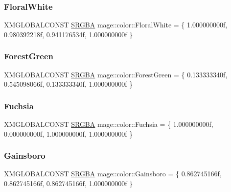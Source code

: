 \hypertarget{namespacemage_1_1color_ac2c360600f107bfa162703196ccf66ac}{}\label{namespacemage_1_1color_ac2c360600f107bfa162703196ccf66ac} 
\subsubsection{\texorpdfstring{Floral\+White}{FloralWhite}}
{\footnotesize\ttfamily X\+M\+G\+L\+O\+B\+A\+L\+C\+O\+N\+ST \hyperlink{structmage_1_1_s_r_g_b_a}{S\+R\+G\+BA} mage\+::color\+::\+Floral\+White = \{ 1.\+000000000f, 0.\+980392218f, 0.\+941176534f, 1.\+000000000f \}}

\hypertarget{namespacemage_1_1color_abb3995cf95a62e2f3407b9193d16fd8e}{}\label{namespacemage_1_1color_abb3995cf95a62e2f3407b9193d16fd8e} 
\subsubsection{\texorpdfstring{Forest\+Green}{ForestGreen}}
{\footnotesize\ttfamily X\+M\+G\+L\+O\+B\+A\+L\+C\+O\+N\+ST \hyperlink{structmage_1_1_s_r_g_b_a}{S\+R\+G\+BA} mage\+::color\+::\+Forest\+Green = \{ 0.\+133333340f, 0.\+545098066f, 0.\+133333340f, 1.\+000000000f \}}

\hypertarget{namespacemage_1_1color_a5da168035660622308cc0dedb7a2c898}{}\label{namespacemage_1_1color_a5da168035660622308cc0dedb7a2c898} 
\subsubsection{\texorpdfstring{Fuchsia}{Fuchsia}}
{\footnotesize\ttfamily X\+M\+G\+L\+O\+B\+A\+L\+C\+O\+N\+ST \hyperlink{structmage_1_1_s_r_g_b_a}{S\+R\+G\+BA} mage\+::color\+::\+Fuchsia = \{ 1.\+000000000f, 0.\+000000000f, 1.\+000000000f, 1.\+000000000f \}}

\hypertarget{namespacemage_1_1color_ad0ca09c87e28accb063961a5a14c909f}{}\label{namespacemage_1_1color_ad0ca09c87e28accb063961a5a14c909f} 
\subsubsection{\texorpdfstring{Gainsboro}{Gainsboro}}
{\footnotesize\ttfamily X\+M\+G\+L\+O\+B\+A\+L\+C\+O\+N\+ST \hyperlink{structmage_1_1_s_r_g_b_a}{S\+R\+G\+BA} mage\+::color\+::\+Gainsboro = \{ 0.\+862745166f, 0.\+862745166f, 0.\+862745166f, 1.\+000000000f \}}

